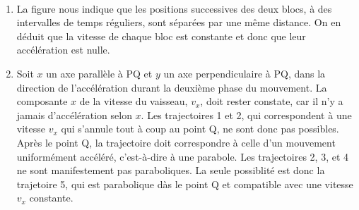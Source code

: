%
%


\\[-3mm]
\begin{enumerate}
\item La figure nous indique que les positions successives des deux blocs, à des intervalles de temps réguliers, sont séparées par une même distance. On en déduit que la vitesse de chaque bloc est constante et donc que leur accélération est nulle.

\item Soit $x$ un axe parallèle à PQ et $y$ un axe perpendiculaire à PQ, dans la direction de l'accélération durant la deuxième phase du mouvement. La composante $x$ de la vitesse du vaisseau, $v_x$, doit rester constate, car il n'y a jamais d'accélération selon $x$. Les trajectoires 1 et 2, qui correspondent à une vitesse $v_x$ qui s'annule tout à coup au point Q, ne sont donc pas possibles. Après le point Q, la trajectoire doit correspondre à celle d'un mouvement uniformément accéléré, c'est-à-dire à une parabole. Les trajectoires 2, 3, et 4 ne sont manifestement pas paraboliques. La seule possiblité est donc la trajetoire 5, qui est parabolique dàs le point Q et compatible avec une vitesse $v_x$ constante.
\end{enumerate}
